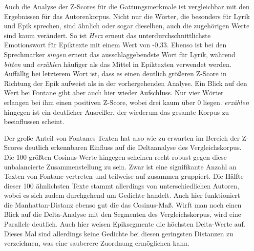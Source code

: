 \documentclass[a4paper,10p]{article}
\begin{document}
Auch die Analyse der Z-Scores für die Gattungsmerkmale ist vergleichbar mit den Ergebnissen für das Autorenkorpus. Nicht nur die Wörter, die besonders für Lyrik und Epik sprechen, sind ähnlich oder sogar dieselben, auch die zugehörigen Werte sind kaum verändert. So ist \textit{Herz} erneut das unterdurchschnittlichste Emotionswort für Epiktexte mit einem Wert von -0,33. Ebenso ist bei den Sprechmarker \textit{singen} erneut das ausschlaggebendste Wort für Lyrik, während \textit{bitten} und \textit{erzählen} häufiger als das Mittel in Epiktexten verwendet werden. Auffällig bei letzterem Wort ist, dass es einen deutlich größeren Z-Score in Richtung der Epik aufweist als in der vorhergehenden Analyse. Ein Blick auf den Wert bei Fontane gibt aber auch hier wieder Aufschluss. Nur vier Wörter erlangen bei ihm einen positiven Z-Score, wobei drei kaum über 0 liegen. \textit{erzählen} hingegen ist ein deutlicher Ausreißer, der wiederum das gesamte Korpus zu beeinflussen scheint. \par 

Der große Anteil von Fontanes Texten hat also wie zu erwarten im Bereich der Z-Scores deutlich erkennbaren Einfluss auf die Deltaanalyse des Vergleichskorpus. Die 100 größten Cosinus-Werte hingegen scheinen recht robust gegen diese unbalancierte Zusammenstellung zu sein. Zwar ist eine signifikante Anzahl an Texten von Fontane vertreten und teilweise auf zusammen gruppiert. Die Hälfte dieser 100 ähnlichsten Texte stammt allerdings von unterschiedlichen Autoren, wobei es sich zudem durchgehend um Gedichte handelt. Auch hier funktioniert die Manhattan-Distanz ebenso gut die das Cosinus-Maß. Wirft man noch einen Blick auf die Delta-Analyse mit den Segmenten des Vergleichskorpus, wird eine Parallele deutlich. Auch hier weisen Epiksegmente die höchsten Delta-Werte auf. Dieses Mal sind allerdings keine Gedichte bei diesen geringsten Distanzen zu verzeichnen, was eine sauberere Zuordnung ermöglichen kann. \par 
\end{document}
